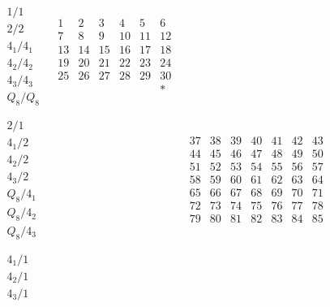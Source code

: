\documentclass[12pt,a4paper]{amsart}
\begin{document}
\newpage

\begin{align*}
  \begin{array}{r||c|c|c|c|c}
    \begin{array}{r}
      1/1 \\
      2/2 \\
      4_1/4_1 \\
      4_2/4_2 \\
      4_3/4_3 \\
      Q_8/Q_8 \\
    \end{array}
&
  \begin{array}{cccccc}
1&2&3&4&5&6\\
7&8&9&10&11&12\\
13&14&15&16&17&18\\
19&20&21&22&23&24\\
25&26&27&28&29&30\\
&&&&&*\\
  \end{array}
&&&& \\ \hline
    \begin{array}{r}
      2/1 \\
      4_1/2 \\
      4_2/2 \\
      4_3/2 \\
      Q_8/4_1 \\
      Q_8/4_2 \\
      Q_8/4_3 \\
    \end{array}
&&
   \begin{array}{cccccccc}
37&38&39&40&41&42&43\\
44&45&46&47&48&49&50\\
51&52&53&54&55&56&57\\
58&59&60&61&62&63&64\\
65&66&67&68&69&70&71\\
72&73&74&75&76&77&78\\
79&80&81&82&83&84&85\\
   \end{array}
&&& \\ \hline
    \begin{array}{r}
      4_1/1 \\
      4_2/1 \\
      4_3/1 \\
    \end{array}
&&&
    \begin{array}{ccc}

\end{array}
\end{array}
\end{align*}
\end{document}
